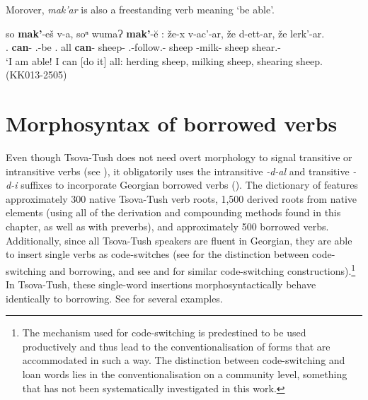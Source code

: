 Morover, \textit{mak'ar} is also a freestanding verb meaning `be able'.


	\begin{exe}
		\ex\label{verbderiv-ex15}
		\gll so \textbf{mak'}-eš v-a, soⁿ wumaɁ \textbf{mak'}-\u{e} : že-x v-ac'-ar, že d-ett-ar, že lerk'-ar. \\
		{\Fsg}.{\Nom} \textbf{can}-{\Simul} {\M}.{\Sg}-be {\Fsg}.{\Dat} all \textbf{can}-{\Npst} {} sheep-{\Cont} {\M}.{\Sg}-follow.{\Ipfv}-{\Vn} sheep {\D}-milk-{\Vn} sheep shear.{\Ipfv}-{\Vn}\\
		\trans `I am able! I can [do it] all: herding sheep, milking sheep, shearing sheep. \\
		\hfill (KK013-2505)
	\end{exe}





\section{Morphosyntax of borrowed verbs} \label{loanverb}



Even though Tsova-Tush does not need overt morphology to signal transitive or intransitive verbs (see ), it obligatorily uses the intransitive \textit{-d-al} and transitive \textit{-d-i} suffixes to incorporate Georgian borrowed verbs (\cites{harris08nativize}). The dictionary of \textcite[]{kadkad84} features approximately 300 native Tsova-Tush verb roots, 1,500 derived roots from native elements (using all of the derivation and compounding methods found in this chapter, as well as with preverbs), and approximately 500 borrowed verbs. Additionally, since all Tsova-Tush speakers are fluent in Georgian, they are able to insert single verbs as code-switches (see  for the distinction between code-switching and borrowing, and see \textcite[]{ritchiebhatia99cs} and \textcite[]{bandiraodendikken14cs} for similar code-switching constructions).\footnote{The mechanism used for code-switching is predestined to be used productively and thus lead to the conventionalisation of forms that are accommodated in such a way. The distinction between code-switching and loan words lies in the conventionalisation on a community level, something that has not been systematically investigated in this work.} In Tsova-Tush, these single-word insertions morphosyntactically behave identically to borrowing. See  for several examples.

